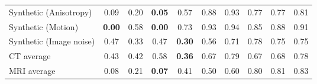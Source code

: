 \begin{landscape}
\begin{table}[p]
\begin{tabular}{lccccccccc}
			Synthetic (Anisotropy)    &            0.09 &            0.20 &  \textbf{0.05}  &            0.57 &            0.88 &            0.93 &  0.77 &     0.77 &  0.81 \\
			Synthetic (Motion)        &  \textbf{0.00}  &            0.58 &  \textbf{0.00}  &            0.73 &            0.93 &            0.94 &  0.85 &     0.88 &  0.91 \\
			Synthetic (Image noise)   &            0.47 &            0.33 &            0.47 &  \textbf{0.30}  &            0.56 &            0.71 &  0.78 &     0.75 &  0.75 \\
			\midrule
			CT average                &            0.43 &            0.42 &            0.58 &  \textbf{0.36}  &            0.67 &            0.79 &  0.67 &     0.68 &  0.78 \\
			MRI average               &            0.08 &            0.21 &  \textbf{0.07}  &            0.41 &            0.50 &            0.60 &  0.80 &     0.81 &  0.83 \\
			\bottomrule
	\end{tabular}%
	\label{tab:res_fpr}
\end{table}
\end{landscape}